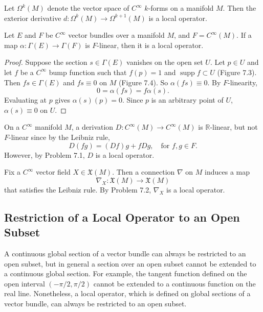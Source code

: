 \begin{example}
\begin{example}
Let $\Omega^k(M)$ denote the vector space of $C^{\infty}$ $k$-forms on a manifold $M$. Then the exterior derivative $d : \Omega^k(M) \to \Omega^{k+1}(M)$ is a local operator.
\end{example}

\begin{proposition}
Let $E$ and $F$ be $C^{\infty}$ vector bundles over a manifold $M$, and $F = C^{\infty}(M)$. If a map $\alpha : \Gamma(E) \to \Gamma(F)$ is $F$-linear, then it is a local operator.
\end{proposition}

\begin{proof}
Suppose the section $s \in \Gamma(E)$ vanishes on the open set $U$. Let $p \in U$ and let $f$ be a $C^{\infty}$ bump function such that $f(p) = 1$ and $\operatorname{supp} f \subset U$ (Figure 7.3). Then $fs \in \Gamma(E)$ and $fs \equiv 0$ on $M$ (Figure 7.4). So $\alpha(fs) \equiv 0$. By $F$-linearity,
\[
0 = \alpha(fs) = f \alpha(s).
\]
Evaluating at $p$ gives $\alpha(s)(p) = 0$. Since $p$ is an arbitrary point of $U$, $\alpha(s) \equiv 0$ on $U$.
\end{proof}


\begin{example}
On a $C^{\infty}$ manifold $M$, a derivation $D : C^{\infty}(M) \to C^{\infty}(M)$ is $\mathbb{R}$-linear, but not $F$-linear since by the Leibniz rule,
\[
D(fg) = (Df)g + fDg, \quad \text{for } f,g \in F.
\]
However, by Problem 7.1, $D$ is a local operator.
\end{example}

\begin{example}
Fix a $C^{\infty}$ vector field $X \in \mathfrak{X}(M)$. Then a connection $\nabla$ on $M$ induces a map
\[
\nabla_X : \mathfrak{X}(M) \to \mathfrak{X}(M)
\]
that satisfies the Leibniz rule. By Problem 7.2, $\nabla_X$ is a local operator.
\end{example}

\subsection{Restriction of a Local Operator to an Open Subset}

A continuous global section of a vector bundle can always be restricted to an open subset, but in general a section over an open subset cannot be extended to a continuous global section. For example, the tangent function defined on the open interval $(-\pi/2, \pi/2)$ cannot be extended to a continuous function on the real line. Nonetheless, a local operator, which is defined on global sections of a vector bundle, can always be restricted to an open subset.


\end{example}
